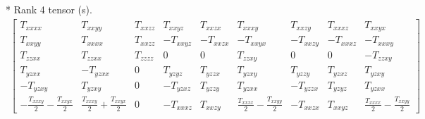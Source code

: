 \documentclass[fleqn,8pt,landscape]{jsarticle}
\begin{document}
* Rank 4 tensor (s).
\begin{align*}
\begin{bmatrix} T_{xxxx} & T_{xxyy} & T_{xxzz} & T_{xxyz} & T_{xxzx} & T_{xxxy} & T_{xxzy} & T_{xxxz} & T_{xxyx} \\ T_{xxyy} & T_{xxxx} & T_{xxzz} & - T_{xxyz} & - T_{xxzx} & - T_{xxyx} & - T_{xxzy} & - T_{xxxz} & - T_{xxxy} \\ T_{zzxx} & T_{zzxx} & T_{zzzz} & 0 & 0 & T_{zzxy} & 0 & 0 & - T_{zzxy} \\ T_{yzxx} & - T_{yzxx} & 0 & T_{yzyz} & T_{yzzx} & T_{yzxy} & T_{yzzy} & T_{yzxz} & T_{yzxy} \\ - T_{yzxy} & T_{yzxy} & 0 & - T_{yzxz} & T_{yzzy} & T_{yzxx} & - T_{yzzx} & T_{yzyz} & T_{yzxx} \\ - \frac{T_{xxxy}}{2} - \frac{T_{xxyx}}{2} & \frac{T_{xxxy}}{2} + \frac{T_{xxyx}}{2} & 0 & - T_{xxxz} & T_{xxzy} & \frac{T_{xxxx}}{2} - \frac{T_{xxyy}}{2} & - T_{xxzx} & T_{xxyz} & \frac{T_{xxxx}}{2} - \frac{T_{xxyy}}{2} \end{bmatrix}
\end{align*}
\end{document}
